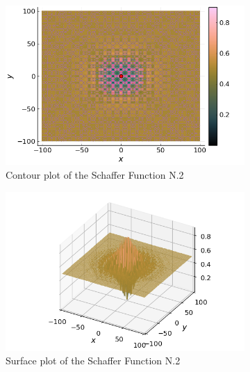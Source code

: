  \begin{figure}[ht!]
    \centering
    \begin{subfigure}[b]{0.45\textwidth}
      \centering
      \includegraphics[width=\textwidth]
        {img/test_functions/schaffer_2_contour.png}
      \caption{Contour plot of the Schaffer Function N.2}
    \end{subfigure}
    \hfill
    \begin{subfigure}[b]{0.45\textwidth}
      \centering
      \includegraphics[width=\textwidth]
        {img/test_functions/schaffer_2_surface.png}
      \caption{Surface plot of the Schaffer Function N.2}
    \end{subfigure}
    \caption{
      a
    }
    \begin{subfigure}[b]{0.45\textwidth}
      \centering

\end{subfigure}
\end{figure}
